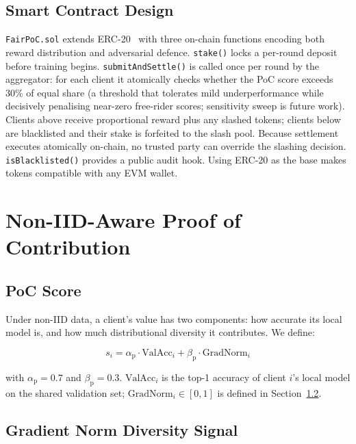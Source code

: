 \documentclass[conference]{IEEEtran}
\theoremstyle{remark}
\begin{document}
\subsection{Smart Contract Design}

\texttt{FairPoC.sol} extends ERC-20~\cite{erc20} with three on-chain
functions encoding both reward distribution and adversarial defence.
\texttt{stake()} locks a per-round deposit before training begins.
\texttt{submitAndSettle()} is called once per round by the aggregator:
for each client it atomically checks whether the PoC score exceeds
$30\%$ of equal share (a threshold that tolerates mild underperformance
while decisively penalising near-zero free-rider scores; sensitivity
sweep is future work). Clients above receive proportional reward
plus any slashed tokens; clients below are blacklisted and their stake
is forfeited to the slash pool.
Because settlement executes atomically on-chain, no trusted party can
override the slashing decision.
\texttt{isBlacklisted()} provides a public audit hook.
Using ERC-20 as the base makes tokens compatible with any EVM wallet.

\section{Non-IID-Aware Proof of Contribution}

\subsection{PoC Score}

Under non-IID data, a client's value has two components: how accurate
its local model is, and how much distributional diversity it contributes.
We define:

\begin{equation}
  s_i = \alpha_{\mathrm{p}} \cdot \mathrm{ValAcc}_i
        + \beta_{\mathrm{p}} \cdot \mathrm{GradNorm}_i
  \label{eq:poc}
\end{equation}

with $\alpha_{\mathrm{p}} = 0.7$ and $\beta_{\mathrm{p}} = 0.3$.
$\mathrm{ValAcc}_i$ is the top-1 accuracy of client $i$'s local model
on the shared validation set; $\mathrm{GradNorm}_i \in [0,1]$ is
defined in Section~\ref{subsec:gradnorm}.

\subsection{Gradient Norm Diversity Signal}
\label{subsec:gradnorm}
\end{document}

